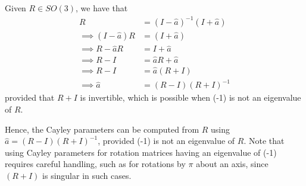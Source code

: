 Given \( R \in SO(3) \), we have that
\begin{align*}
    R
     & =
    (I - \hat{a})^{-1} (I + \hat{a})
    \\
    \implies
    (I - \hat{a}) R
     & =
    (I + \hat{a})
    \\
    \implies
    R - \hat{a} R
     & =
    I + \hat{a}
    \\
    \implies
    R - I
     & =
    \hat{a} R + \hat{a}
    \\
    \implies
    R - I
     & =
    \hat{a} (R + I)
    \\
    \implies
    \hat{a}
     & =
    (R - I)(R + I)^{-1}
\end{align*}
provided that \( R + I \) is invertible, which is possible when (-1) is not an eigenvalue of \( R \).

Hence, the Cayley parameters can be computed from \( R \) using \( \boxed{ \hat{a} = (R - I){(R + I)}^{-1} } \), provided (-1) is not an eigenvalue of \( R \).
Note that using Cayley parameters for rotation matrices having an eigenvalue of (-1) requires careful handling, such as for rotations by \( \pi \) about an axis, since \( (R + I) \) is singular in such cases.
